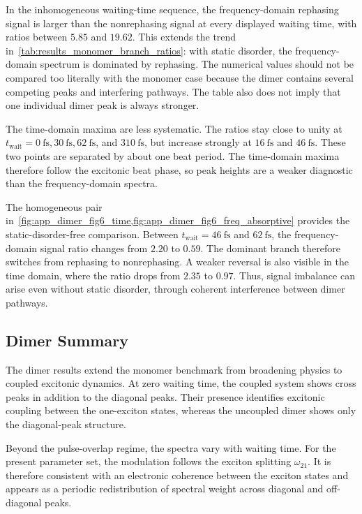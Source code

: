 In the inhomogeneous waiting-time sequence, the frequency-domain rephasing signal is larger than the nonrephasing signal at every displayed waiting time, with ratios between $5.85$ and $19.62$. This extends the trend in~\autoref{tab:results_monomer_branch_ratios}: with static disorder, the frequency-domain spectrum is dominated by rephasing. The numerical values should not be compared too literally with the monomer case because the dimer contains several competing peaks and interfering pathways. The table also does not imply that one individual dimer peak is always stronger.

The time-domain maxima are less systematic. The ratios stay close to unity at \(t_{\mathrm{wait}}=\SI{0}{\femto\second},\SI{30}{\femto\second},\SI{62}{\femto\second}\), and \(\SI{310}{\femto\second}\), but increase strongly at \(\SI{16}{\femto\second}\) and \(\SI{46}{\femto\second}\). These two points are separated by about one beat period. The time-domain maxima therefore follow the excitonic beat phase, so peak heights are a weaker diagnostic than the frequency-domain spectra.

The homogeneous pair in~\cref{fig:app_dimer_fig6_time,fig:app_dimer_fig6_freq_absorptive} provides the static-disorder-free comparison. Between \(t_{\mathrm{wait}}=\SI{46}{\femto\second}\) and \(\SI{62}{\femto\second}\), the frequency-domain signal ratio changes from \(2.20\) to \(0.59\). The dominant branch therefore switches from rephasing to nonrephasing. A weaker reversal is also visible in the time domain, where the ratio drops from \(2.35\) to \(0.97\). Thus, signal imbalance can arise even without static disorder, through coherent interference between dimer pathways.

\subsection{Dimer Summary}
\label{subsec:results_dimer_summary}

The dimer results extend the monomer benchmark from broadening physics to coupled excitonic dynamics. At zero waiting time, the coupled system shows cross peaks in addition to the diagonal peaks. Their presence identifies excitonic coupling between the one-exciton states, whereas the uncoupled dimer shows only the diagonal-peak structure.

Beyond the pulse-overlap regime, the spectra vary with waiting time. For the present parameter set, the modulation follows the exciton splitting \(\omega_{21}\). It is therefore consistent with an electronic coherence between the exciton states and appears as a periodic redistribution of spectral weight across diagonal and off-diagonal peaks.

